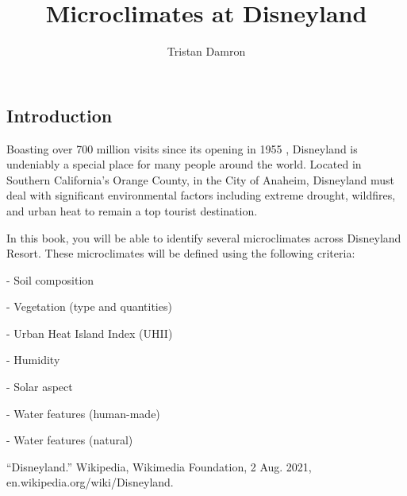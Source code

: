 \documentclass[11pt]{book}
\title{\textbf{Microclimates at Disneyland}}
\author{Tristan Damron}
\date{}
\begin{document}
\chapter{}

\section{Introduction}

Boasting over 700 million visits since its opening in 1955 \cite{disneyland}, Disneyland is undeniably a special place for many people around the world. Located in Southern California's Orange County, in the City of Anaheim, Disneyland must deal with significant environmental factors including extreme drought, wildfires, and urban heat to remain a top tourist destination.

In this book, you will be able to identify several microclimates across Disneyland Resort. These microclimates will be defined using the following criteria:

- Soil composition

- Vegetation (type and quantities)

- Urban Heat Island Index (UHII)

- Humidity

- Solar aspect
 
- Water features (human-made)

- Water features (natural)
 

\begin{thebibliography}{9}

“Disneyland.” Wikipedia, Wikimedia Foundation, 2 Aug. 2021, en.wikipedia.org/wiki/Disneyland. 
\end{thebibliography}
\end{document}
